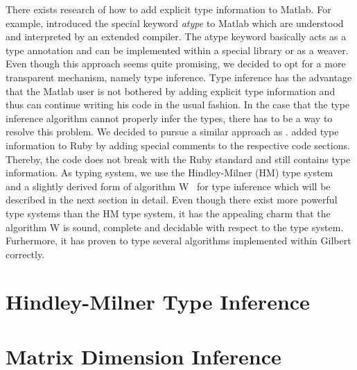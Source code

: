 There exists research of how to add explicit type information to Matlab.
For example, \textcite{hendren:2011a} introduced the special keyword \emph{atype} to Matlab which are understood and interpreted by an extended compiler.
The atype keyword basically acts as a type annotation and can be implemented within a special library or as a weaver.
Even though this approach seems quite promising, we decided to opt for a more transparent mechanism, namely type inference.
Type inference has the advantage that the Matlab user is not bothered by adding explicit type information and thus can continue writing his code in the usual fashion.
In the case that the type inference algorithm cannot properly infer the types, there has to be a way to resolve this problem.
We decided to pursue a similar approach as \textcite{furr:2009a}.
\citeauthor{furr:2009a} added type information to Ruby by adding special comments to the respective code sections.
Thereby, the code does not break with the Ruby standard and still contains type information.
As typing system, we use the Hindley-Milner (HM) type system~\cite{hindley:tams1969a,milner:jcss1978a} and a slightly derived form of algorithm W~\cite{damas:1982a} for type inference which will be described in the next section in detail.
Even though there exist more powerful type systems than the HM type system, it has the appealing charm that the algorithm W is sound, complete and decidable with respect to the type system.
Furhermore, it has proven to type several algorithms implemented within Gilbert correctly.

\section{Hindley-Milner Type Inference}

\section{Matrix Dimension Inference}